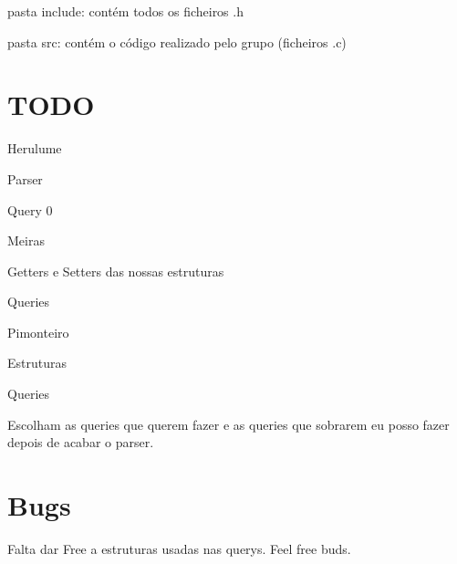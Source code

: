 
\begin{DoxyItemize}
\item pasta {\ttfamily include}\+: contém todos os ficheiros {\ttfamily .h}
\item pasta {\ttfamily src}\+: contém o código realizado pelo grupo (ficheiros {\ttfamily .c})
\end{DoxyItemize}

\section*{T\+O\+DO}


\begin{DoxyItemize}
\item Herulume
\begin{DoxyItemize}
\item Parser
\item Query 0
\end{DoxyItemize}
\item Meiras
\begin{DoxyItemize}
\item Getters e Setters das nossas estruturas
\item Queries
\end{DoxyItemize}
\item Pimonteiro
\begin{DoxyItemize}
\item Estruturas
\item Queries
\end{DoxyItemize}
\end{DoxyItemize}

Escolham as queries que querem fazer e as queries que sobrarem eu posso fazer depois de acabar o parser.

\section*{Bugs}


\begin{DoxyItemize}
\item Falta dar Free a estruturas usadas nas querys. Feel free buds. 
\end{DoxyItemize}